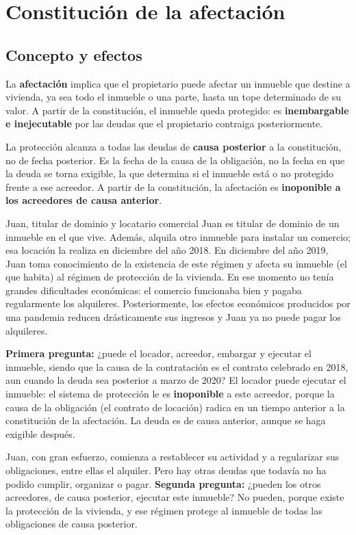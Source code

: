 \documentclass[12pt,oneside]{book}
\begin{document}
\section{Constitución de la afectación}

\subsection{Concepto y efectos}

La \textbf{afectación} implica que el propietario puede afectar un inmueble que destine a vivienda, ya sea todo el inmueble o una parte, hasta un tope determinado de su valor. A partir de la constitución, el inmueble queda protegido: es \textbf{inembargable e inejecutable} por las deudas que el propietario contraiga posteriormente.

\begin{importante}
La protección alcanza a todas las deudas de \textbf{causa posterior} a la constitución, no de fecha posterior. Es la fecha de la causa de la obligación, no la fecha en que la deuda se torna exigible, la que determina si el inmueble está o no protegido frente a ese acreedor. A partir de la constitución, la afectación es \textbf{inoponible a los acreedores de causa anterior}.
\end{importante}

\begin{ejemplo}{Juan, titular de dominio y locatario comercial}
Juan es titular de dominio de un inmueble en el que vive. Además, alquila otro inmueble para instalar un comercio; esa locación la realiza en diciembre del año 2018. En diciembre del año 2019, Juan toma conocimiento de la existencia de este régimen y afecta su inmueble (el que habita) al régimen de protección de la vivienda. En ese momento no tenía grandes dificultades económicas: el comercio funcionaba bien y pagaba regularmente los alquileres. Posteriormente, los efectos económicos producidos por una pandemia reducen drásticamente sus ingresos y Juan ya no puede pagar los alquileres.

\textbf{Primera pregunta:} ¿puede el locador, acreedor, embargar y ejecutar el inmueble, siendo que la causa de la contratación es el contrato celebrado en 2018, aun cuando la deuda sea posterior a marzo de 2020? El locador puede ejecutar el inmueble: el sistema de protección le es \textbf{inoponible} a este acreedor, porque la causa de la obligación (el contrato de locación) radica en un tiempo anterior a la constitución de la afectación. La deuda es de causa anterior, aunque se haga exigible después.

Juan, con gran esfuerzo, comienza a restablecer su actividad y a regularizar sus obligaciones, entre ellas el alquiler. Pero hay otras deudas que todavía no ha podido cumplir, organizar o pagar. \textbf{Segunda pregunta:} ¿pueden los otros acreedores, de causa posterior, ejecutar este inmueble? No pueden, porque existe la protección de la vivienda, y ese régimen protege al inmueble de todas las obligaciones de causa posterior.
\end{ejemplo}
\end{document}
